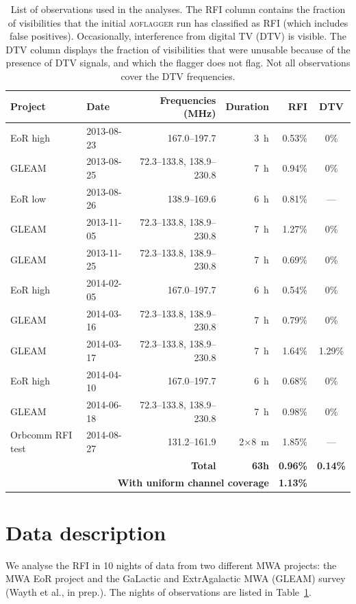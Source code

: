 \documentclass{pasa}
\begin{document}
\begin{table}
\caption{List of observations used in the analyses. The RFI column contains the fraction of visibilities that the initial \textsc{aoflagger} run has classified as RFI (which includes false positives). Occasionally, interference from digital TV (DTV) is visible. The DTV column displays the fraction of visibilities that were unusable because of the presence of DTV signals, and which the flagger does not flag. Not all observations cover the DTV frequencies.}\label{tbl:obs-list}
\begin{center}%
\begin{tabular}{|l|l|r|r|r|c|}
\hline
\textbf{Project} &\textbf{Date} & \textbf{Frequencies (MHz)} & \textbf{Duration} & RFI & DTV \\
\hline
EoR high& 2013-08-23 & 167.0--197.7              & 3~h & 0.53\% & 0\% \\
GLEAM & 2013-08-25 & 72.3--133.8, 138.9--230.8 & 7~h & 0.94\% & 0\% \\
EoR low& 2013-08-26 & 138.9--169.6              & 6~h & 0.81\% & ---\\
GLEAM & 2013-11-05 & 72.3--133.8, 138.9--230.8 & 7~h & 1.27\% & 0\% \\
GLEAM & 2013-11-25 & 72.3--133.8, 138.9--230.8 & 7~h & 0.69\% & 0\% \\
EoR high& 2014-02-05 & 167.0--197.7              & 6~h & 0.54\% & 0\%\\
GLEAM & 2014-03-16 & 72.3--133.8, 138.9--230.8 & 7~h & 0.79\% & 0\% \\
GLEAM & 2014-03-17 & 72.3--133.8, 138.9--230.8 & 7~h & 1.64\% & 1.29\% \\
EoR high& 2014-04-10 & 167.0--197.7              & 6~h & 0.68\% & 0\%\\
GLEAM & 2014-06-18 & 72.3--133.8, 138.9--230.8 & 7~h & 0.98\% & 0\% \\
Orbcomm RFI test&2014-08-27& 131.2--161.9     & 2$\times$8~m& 1.85\% & --- \\
\hline
\multicolumn{3}{|r|}{\textbf{Total}} & \textbf{63h} & \textbf{0.96\%} & \textbf{0.14\%}\\
\hline
\multicolumn{4}{|r|}{\textbf{With uniform channel coverage}} & \textbf{1.13\%} & \\
\hline
\end{tabular}
\end{center}
\end{table}

\section{Data description} \label{ch:data-description}
We analyse the RFI in 10 nights of data from two different MWA projects: the MWA EoR project \citep{bowman-science-with-the-mwa-2013} and the GaLactic and ExtrAgalactic MWA (GLEAM) survey (Wayth et al., in prep.). The nights of observations are listed in Table~\ref{tbl:obs-list}.
\end{document}
